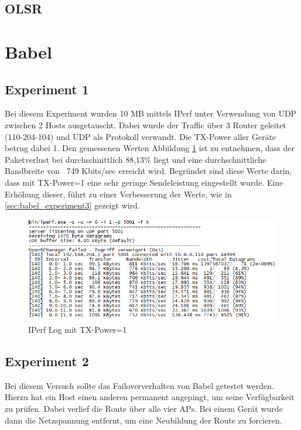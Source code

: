 \documentclass[10pt]{scrartcl}
\begin{document}
	\subsection{OLSR}

\section{Babel}
	\subsection{Experiment 1}\label{sec:babel_experiment1}
	Bei diesem Experiment wurden 10 MB mittels IPerf  unter Verwendung von UDP zwischen 2 Hosts ausgetauscht. Dabei wurde der Traffic über 3 Router geleitet (110-204-104) und UDP als Protokoll verwandt. Die TX-Power aller Geräte betrug dabei 1. 
Den gemessenen Werten Abbildung \ref{img:babel_iperf_tx1} ist zu entnehmen, dass der Paketverlust bei durchschnittlich 88,13\% liegt und eine durchschnittliche Bandbreite von ~749 Kbits/sec erreicht wird.
Begründet sind diese Werte darin, dass mit TX-Power=1 eine sehr geringe Sendeleistung eingestellt wurde. Eine Erhöhung dieser, führt zu einer Verbesserung der Werte, wie in \ref{sec:babel_experiment3} gezeigt wird.

	\begin{figure}
        \centering
                \includegraphics[width=\textwidth]{img/Babel_TX1_Protokoll}
        \caption{IPerf Log mit TX-Power=1}
        \label{img:babel_iperf_tx1}
	\end{figure}
	

	
	\subsection{Experiment 2}
	Bei diesem Versuch sollte das Failoververhalten von Babel getestet werden. Hierzu hat ein Host einen anderen permanent angepingt, um seine Verfügbarkeit zu prüfen. Dabei verlief die Route über alle vier APs. Bei einem Gerät wurde dann die Netzspannung entfernt, um eine Neubildung der Route zu forcieren.
	
\end{document}
